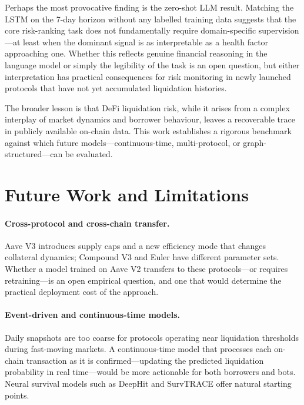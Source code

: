 \documentclass[12pt,a4paper]{article}
\begin{document}
Perhaps the most provocative finding is the zero-shot LLM result.
Matching the LSTM on the 7-day horizon without any labelled training data
suggests that the core risk-ranking task does not fundamentally require
domain-specific supervision---at least when the dominant signal is as
interpretable as a health factor approaching one.  Whether this reflects
genuine financial reasoning in the language model or simply the legibility
of the task is an open question, but either interpretation has practical
consequences for risk monitoring in newly launched protocols that have not
yet accumulated liquidation histories.

The broader lesson is that DeFi liquidation risk, while it arises from a
complex interplay of market dynamics and borrower behaviour, leaves a
recoverable trace in publicly available on-chain data.  This work
establishes a rigorous benchmark against which future models---continuous-time,
multi-protocol, or graph-structured---can be evaluated.


\section{Future Work and Limitations}
\label{sec:future}

\paragraph{Cross-protocol and cross-chain transfer.}
Aave V3 introduces supply caps and a new efficiency mode that changes
collateral dynamics; Compound V3 and Euler have different parameter sets.
Whether a model trained on Aave V2 transfers to these protocols---or
requires retraining---is an open empirical question, and one that would
determine the practical deployment cost of the approach.

\paragraph{Event-driven and continuous-time models.}
Daily snapshots are too coarse for protocols operating near liquidation
thresholds during fast-moving markets.  A continuous-time model that
processes each on-chain transaction as it is confirmed---updating the
predicted liquidation probability in real time---would be more actionable
for both borrowers and bots.  Neural survival models such as DeepHit
\citep{lee2018deephit} and SurvTRACE \citep{wang2022survtrace} offer
natural starting points.
\end{document}
